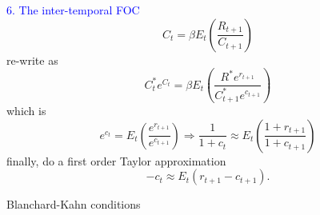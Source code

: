 \textcolor{blue}{6. The inter-temporal FOC}
$${C_t}=\beta E_t\left(\frac{R_{t+1}}{C_{t+1}}\right) $$
re-write as
$$C_t^*e^{C_t}=\beta E_t\left(\frac{R^*e^{r_{t+1}}}{C_{t+1}^*e^{c_{t+1}}}\right)$$
which is
$$e^{c_t}=E_t\left(\frac{e^{r_{t+1}}}{e^{c_{t+1}}}\right)\Rightarrow\frac1{1+c_t}\approx E_t\left(\frac{1+r_{t+1}}{1+c_{t+1}}\right)$$
finally, do a first order Taylor approximation
$$-c_t\approx E_t(r_{t+1}-c_{t+1}). $$

Blanchard-Kahn conditions
